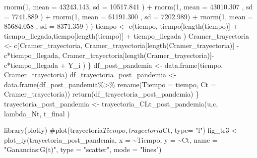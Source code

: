 \documentclass[
  us-letterpaper,
]{scrreprt}
\newenvironment{Shaded}{\begin{snugshade}}{\end{snugshade}}
\newcommand{\AttributeTok}[1]{\textcolor[rgb]{0.40,0.45,0.13}{#1}}
\newcommand{\CommentTok}[1]{\textcolor[rgb]{0.37,0.37,0.37}{#1}}
\newcommand{\DecValTok}[1]{\textcolor[rgb]{0.68,0.00,0.00}{#1}}
\newcommand{\FloatTok}[1]{\textcolor[rgb]{0.68,0.00,0.00}{#1}}
\newcommand{\FunctionTok}[1]{\textcolor[rgb]{0.28,0.35,0.67}{#1}}
\newcommand{\NormalTok}[1]{\textcolor[rgb]{0.00,0.23,0.31}{#1}}
\newcommand{\OtherTok}[1]{\textcolor[rgb]{0.00,0.23,0.31}{#1}}
\newcommand{\SpecialCharTok}[1]{\textcolor[rgb]{0.37,0.37,0.37}{#1}}
\newcommand{\StringTok}[1]{\textcolor[rgb]{0.13,0.47,0.30}{#1}}
\theoremstyle{plain}
\theoremstyle{plain}
\theoremstyle{definition}
\theoremstyle{remark}
\begin{document}
\begin{Shaded}
\begin{Highlighting}[]
\FunctionTok{rnorm}\NormalTok{(}\DecValTok{1}\NormalTok{, }\AttributeTok{mean =}   \FloatTok{43243.143}\NormalTok{, }\AttributeTok{sd =} \FloatTok{10517.841}\NormalTok{ ) }\SpecialCharTok{+} 
\FunctionTok{rnorm}\NormalTok{(}\DecValTok{1}\NormalTok{, }\AttributeTok{mean =} \FloatTok{43010.307}\NormalTok{  , }\AttributeTok{sd =} \FloatTok{7741.889}\NormalTok{ ) }\SpecialCharTok{+} 
\FunctionTok{rnorm}\NormalTok{(}\DecValTok{1}\NormalTok{, }\AttributeTok{mean =} \FloatTok{61191.300}\NormalTok{  , }\AttributeTok{sd =} \FloatTok{7202.989}\NormalTok{) }\SpecialCharTok{+} 
\FunctionTok{rnorm}\NormalTok{(}\DecValTok{1}\NormalTok{, }\AttributeTok{mean =}  \FloatTok{85684.058}\NormalTok{ , }\AttributeTok{sd =} \FloatTok{8371.359}\NormalTok{ ) ) }
\NormalTok{    tiempo }\OtherTok{\textless{}{-}} \FunctionTok{c}\NormalTok{(tiempo, tiempo[}\FunctionTok{length}\NormalTok{(tiempo)] }
    \SpecialCharTok{+}\NormalTok{ tiempo\_llegada,tiempo[}\FunctionTok{length}\NormalTok{(tiempo)]}
    \SpecialCharTok{+}\NormalTok{ tiempo\_llegada ) }
\NormalTok{    Cramer\_trayectoria }\OtherTok{\textless{}{-}} \FunctionTok{c}\NormalTok{(Cramer\_trayectoria,}
\NormalTok{    Cramer\_trayectoria[}\FunctionTok{length}\NormalTok{(Cramer\_trayectoria)]}
    \SpecialCharTok{{-}}\NormalTok{ c}\SpecialCharTok{*}\NormalTok{tiempo\_llegada,}
\NormalTok{    Cramer\_trayectoria[}\FunctionTok{length}\NormalTok{(Cramer\_trayectoria)]}\SpecialCharTok{{-}}
\NormalTok{    c}\SpecialCharTok{*}\NormalTok{tiempo\_llegada }\SpecialCharTok{+}\NormalTok{  Y\_i )}
\NormalTok{  \}}
\NormalTok{  df\_post\_pandemia }\OtherTok{\textless{}{-}} \FunctionTok{data.frame}\NormalTok{(tiempo, Cramer\_trayectoria)}
\NormalTok{df\_trayectoria\_post\_pandemia }\OtherTok{\textless{}{-}} \FunctionTok{data.frame}\NormalTok{(df\_post\_pandemia}\SpecialCharTok{\%\textgreater{}\%}
                                        \FunctionTok{rename}\NormalTok{(}\AttributeTok{Tiempo =}\NormalTok{ tiempo,}
    \AttributeTok{Ct =}\NormalTok{ Cramer\_trayectoria))}
  \FunctionTok{return}\NormalTok{(df\_trayectoria\_post\_pandemia)}
\NormalTok{\}}
\NormalTok{trayectoria\_post\_pandemia }\OtherTok{\textless{}{-}} \FunctionTok{trayectoria\_CLt\_post\_pandemia}\NormalTok{(u,c,}
\NormalTok{                                            lambda\_Nt, t\_final )}

\FunctionTok{library}\NormalTok{(plotly)}
\CommentTok{\#plot(trayectoria$Tiempo, trayectoria$Ct, type= "l")}
\NormalTok{fig\_tr3 }\OtherTok{\textless{}{-}} \FunctionTok{plot\_ly}\NormalTok{(trayectoria\_post\_pandemia, }\AttributeTok{x =} \SpecialCharTok{\textasciitilde{}}\NormalTok{Tiempo, }
                                              \AttributeTok{y =} \SpecialCharTok{\textasciitilde{}}\NormalTok{Ct,}
            \AttributeTok{name =} \StringTok{"Ganancias:G(t)"}\NormalTok{,}
            \AttributeTok{type =} \StringTok{"scatter"}\NormalTok{, }\AttributeTok{mode =} \StringTok{"lines"}\NormalTok{)}


\end{Highlighting}
\end{Shaded}
\end{document}
